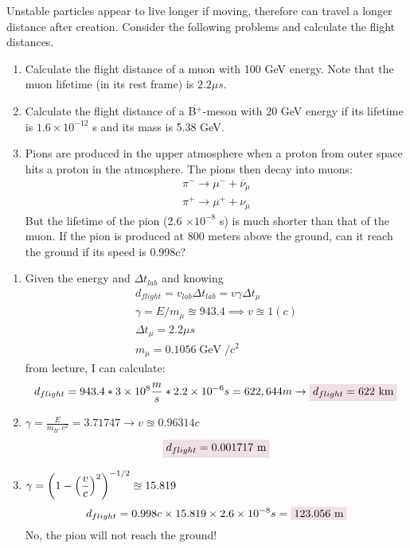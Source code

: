 \documentclass{article}
\DeclareMathOperator{\GeV}{GeV}
\begin{document}
\newpage
\begin{problem}
    Unstable particles appear to live longer if moving, therefore can travel a longer distance after creation. Consider the following problems and calculate the flight distances. 
    \begin{enumerate}[label=\alph*.]
        \item Calculate the flight distance of a muon with 100 GeV energy. Note that the muon lifetime (in its rest frame) is $2.2 \mu s$. 
        \item Calculate the flight distance of a B$^{+}$-meson with 20 GeV energy if its lifetime is $1.6\times10^{-12}$ s and its mass is 5.38 GeV. 
        \item Pions are produced in the upper atmosphere when a proton from outer space hits a proton in the atmosphere. The pions then decay into muons:
        \begin{gather*} 
            \pi^{-}\rightarrow \mu^{-}+\overline{\nu}_\mu
            \\
            \pi^{+}\rightarrow \mu^{+}+\nu_\mu
        \end{gather*}
        But the lifetime of the pion (2.6 $\times10^{-8}$ s) is much shorter than that of the muon. If the pion is produced at 800 meters above the ground, can it reach the ground if its speed is 0.998c?
    \end{enumerate}
    \answerline
    \begin{enumerate}[label=\alph*.]
        \item Given the energy and $\Delta t_{lab}$ and knowing 
        \begin{gather*}
            d_{flight}=v_{lab}\Delta t_{lab}=\boxed{v\gamma\Delta t_{\mu}}
            \\
            \gamma=E/m_\mu\approxeq 943.4\implies v\approxeq1(c)
            \\
            \Delta t_\mu=2.2\mu s
            \\
            m_\mu=0.1056\GeV/c^2
        \end{gather*} 
        from lecture, I can calculate:
        \begin{equation*}
            d_{flight}=943.4*3\times10^{8}\frac{m}{s}*2.2\times10^{-6}s=622,644m
            \rightarrow
            \coloredanswer{d_{flight}=622~\text{km}}
        \end{equation*}
        \item $\gamma=\frac{E}{m_{B^+}c^2}=3.71747\rightarrow v\approxeq0.96314c$
        \begin{equation*}
            \coloredanswer{d_{flight}=0.001717~\text{m}}
        \end{equation*}
        \item $\displaystyle\gamma=\qty(1-\qty(\frac{v}{c})^2)^{-1/2}\approxeq 15.819$
        \begin{equation*}
            d_{flight}=0.998c\times15.819\times2.6\times10^{-8}s=\coloredanswer{123.056~\text{m}}
        \end{equation*}
        No, the pion will not reach the ground!
    \end{enumerate}
\end{problem}
\end{document}
